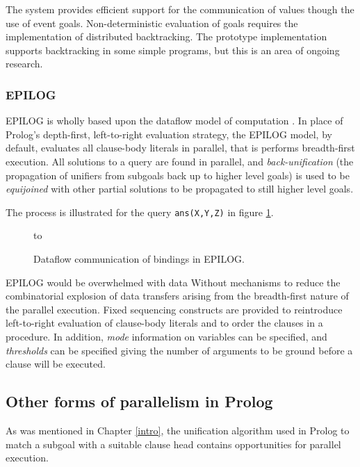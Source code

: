 The system provides efficient support for the communication of values though the
use of event goals.  Non-deterministic evaluation of goals requires the implementation
of distributed backtracking.  The prototype implementation  supports backtracking in
some simple programs, but this is an area of ongoing research.

\subsubsection{EPILOG}


EPILOG is wholly based upon the dataflow model of computation \cite{Wis86}.  In
place of Prolog's depth-first, left-to-right evaluation strategy, the EPILOG model,
by default, evaluates all clause-body literals in parallel, that is performs
breadth-first execution.  All solutions to a query are found in parallel, and
\textit{back-unification} (the propagation of unifiers from subgoals back up to higher
level goals) is used to be \textit{equijoined} with other partial solutions to be
propagated to still higher level goals.

The process is illustrated for the query \texttt{ans(X,Y,Z)} in figure \ref{epilog}.

\begin{figure}[h]
\vspace{5mm} \hbox to 
\caption{Dataflow communication of bindings in EPILOG.}
\vspace{5mm}
\label{epilog}
\end{figure}

EPILOG would be
overwhelmed with data
Without mechanisms to reduce the combinatorial explosion of data transfers arising from
the breadth-first nature of the parallel execution.  Fixed sequencing constructs are
provided to reintroduce left-to-right evaluation of clause-body literals and to
order the clauses in a procedure.  In addition, \textit{mode} information on variables
can be specified, and \textit{thresholds} can be specified giving the number of
arguments to be ground before a clause will be executed.

\subsection{Other forms of parallelism in Prolog}

As was mentioned in Chapter \ref{intro}, the unification algorithm used in Prolog 
to match a subgoal with a suitable clause head contains opportunities for
parallel execution.

